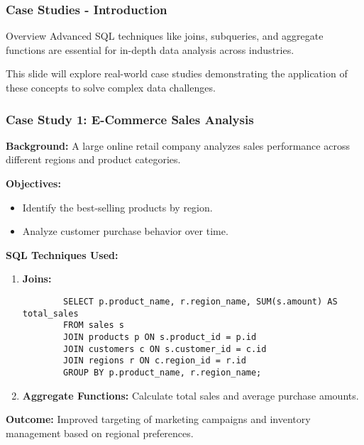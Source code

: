\documentclass[aspectratio=169]{beamer}
\begin{document}
\begin{frame}[fragile]
    \frametitle{Case Studies - Introduction}
    \begin{block}{Overview}
        Advanced SQL techniques like joins, subqueries, and aggregate functions are essential for in-depth data analysis across industries.
    \end{block}
    
    This slide will explore real-world case studies demonstrating the application of these concepts to solve complex data challenges.
\end{frame}

\begin{frame}[fragile]
    \frametitle{Case Study 1: E-Commerce Sales Analysis}
    
    \textbf{Background:} A large online retail company analyzes sales performance across different regions and product categories.
    
    \textbf{Objectives:}
    \begin{itemize}
        \item Identify the best-selling products by region.
        \item Analyze customer purchase behavior over time.
    \end{itemize}
    
    \textbf{SQL Techniques Used:}
    \begin{enumerate}
        \item \textbf{Joins:}
        \begin{lstlisting}
        SELECT p.product_name, r.region_name, SUM(s.amount) AS total_sales
        FROM sales s
        JOIN products p ON s.product_id = p.id
        JOIN customers c ON s.customer_id = c.id
        JOIN regions r ON c.region_id = r.id
        GROUP BY p.product_name, r.region_name;
        \end{lstlisting}
        
        \item \textbf{Aggregate Functions:} 
        Calculate total sales and average purchase amounts.
    \end{enumerate}
    
    \textbf{Outcome:} Improved targeting of marketing campaigns and inventory management based on regional preferences.
\end{frame}
\end{document}
